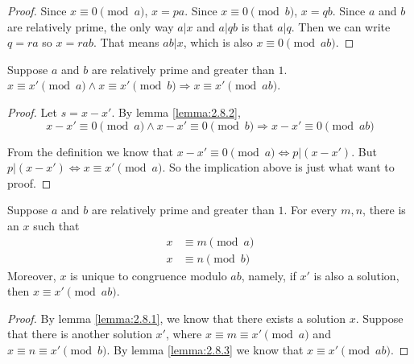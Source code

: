 \documentclass[11pt]{article}
\begin{document}
\begin{proof}
Since $x \equiv 0 \pmod{a}$, $x = pa$. Since $x \equiv 0 \pmod{b}$, $x = qb$. Since $a$ and
$b$ are relatively prime, the only way $a|x$ and $a|qb$ is that $a|q$. Then we can write
$q=ra$ so $x=rab$. That means $ab|x$, which is also $x \equiv 0 \pmod{ab}$.
\end{proof}

\begin{lemma} \label{lemma:2.8.3}
Suppose $a$ and $b$ are relatively prime and greater than $1$.
$x \equiv x' \pmod{a} \wedge x \equiv x' \pmod{b} \Rightarrow x \equiv x' \pmod{ab}$.
\end{lemma}

\begin{proof}
Let $s = x - x'$. By lemma \ref{lemma:2.8.2},
\[
x-x' \equiv 0 \pmod{a} \wedge x-x' \equiv 0 \pmod{b} \Rightarrow x-x' \equiv 0 \pmod{ab}
\]

From the definition we know that $x-x' \equiv 0 \pmod{a} \Leftrightarrow p|(x-x')$. But
$p|(x-x') \Leftrightarrow x \equiv x' \pmod{a}$. So the implication above is just what want
to proof.
\end{proof}

\begin{theorem} \label{theorem:2.8}
Suppose $a$ and $b$ are relatively prime and greater than $1$. For every $m,n$, there is an
$x$ such that
\begin{align*}
x &\equiv m \pmod{a} \\
x &\equiv n \pmod{b}
\end{align*}
Moreover, $x$ is unique to congruence modulo $ab$, namely, if $x'$ is also a solution, then
$x \equiv x' \pmod{ab}$.
\end{theorem}

\begin{proof}
By lemma \ref{lemma:2.8.1}, we know that there exists a solution $x$. Suppose that there is
another solution $x'$, where $x \equiv m \equiv x' \pmod{a}$ and $x \equiv n \equiv x'
\pmod{b}$. By lemma \ref{lemma:2.8.3} we know that $x \equiv x' \pmod{ab}$.
\end{proof}
\end{document}
